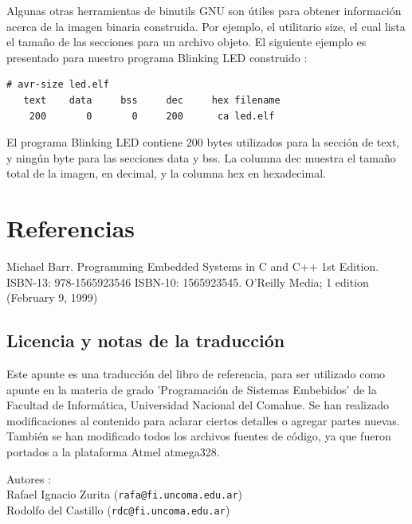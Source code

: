 \documentclass[12pt]{article}
\begin{document}
Algunas otras herramientas de binutils GNU son útiles para obtener 
información acerca de la imagen binaria construida.
Por ejemplo, el utilitario size, el cual lista el tamaño de las secciones
para un archivo objeto. El siguiente ejemplo es presentado
para nuestro programa Blinking LED construido :

\begin{verbatim}
# avr-size led.elf
   text	   data	    bss	    dec	    hex	filename
    200	      0	      0	    200	     ca	led.elf
\end{verbatim}

El programa Blinking LED contiene 200 bytes utilizados para la sección de text, y
ningún byte para las secciones data y bss. La columna dec muestra el tamaño
total de la imagen, en decimal, y la columna hex en hexadecimal.





\section*{Referencias}

Michael Barr. Programming Embedded Systems in C and C++ 1st Edition. ISBN-13: 978-1565923546
ISBN-10: 1565923545. O'Reilly Media; 1 edition (February 9, 1999)




\subsection*{Licencia y notas de la traducción}

Este apunte es una traducción del libro de referencia, para
ser utilizado como apunte en la materia de grado
'Programación de Sistemas Embebidos' de la Facultad de Informática,
Universidad Nacional del Comahue.
Se han realizado modificaciones
al contenido para aclarar ciertos detalles o agregar partes nuevas.
 También se han
modificado todos los archivos fuentes de código, ya que fueron
portados a la plataforma Atmel atmega328.

Autores : \\
Rafael Ignacio Zurita ({\tt rafa@fi.uncoma.edu.ar}) \\
Rodolfo del Castillo ({\tt rdc@fi.uncoma.edu.ar})






\end{document}
